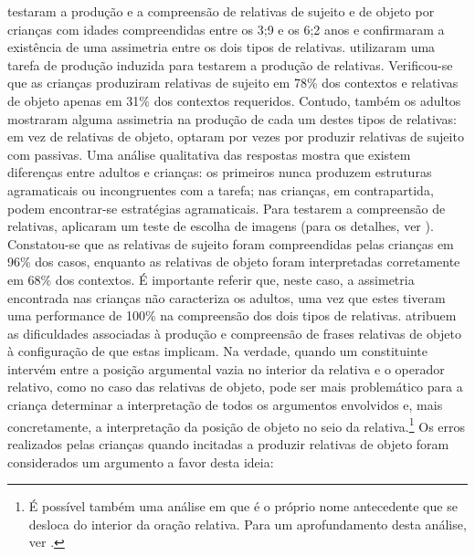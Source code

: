 \documentclass[output=paper]{LSP/langsci}
\begin{document}
\citet{costa_etal2011} testaram a produção e a compreensão de relativas de sujeito e de objeto por crianças com idades compreendidas entre os 3;9 e os 6;2 anos e confirmaram a existência de uma assimetria entre os dois tipos de relativas. \citet{costa_etal2011} utilizaram uma tarefa de produção induzida para testarem a produção de relativas. Verificou-se que as crianças produziram relativas de sujeito em 78\% dos contextos e relativas de objeto apenas em 31\% dos contextos requeridos. Contudo, também os adultos mostraram alguma assimetria na produção de cada um destes tipos de relativas: em vez de relativas de objeto, optaram por vezes por produzir relativas de sujeito com passivas. Uma análise qualitativa das respostas mostra que existem diferenças entre adultos e crianças: os primeiros nunca produzem estruturas agramaticais ou incongruentes com a tarefa; nas crianças, em contrapartida, podem encontrar-se estratégias agramaticais. Para testarem a compreensão de relativas, \citet{costa_etal2011} aplicaram um teste de escolha de imagens (para os detalhes, ver \citealt{costa_etal2011}). Constatou-se que as relativas de sujeito foram compreendidas pelas crianças em 96\% dos casos, enquanto as relativas de objeto foram interpretadas corretamente em 68\% dos contextos. É importante referir que, neste caso, a assimetria encontrada nas crianças não caracteriza os adultos, uma vez que estes tiveram uma performance de 100\% na compreensão dos dois tipos de relativas. \citet{costa_etal2011} atribuem as dificuldades associadas à produção e compreensão de frases relativas de objeto à configuração de  que estas implicam. Na verdade, quando um constituinte intervém entre a posição argumental vazia no interior da relativa e o operador relativo, como no caso das relativas de objeto, pode ser mais problemático para a criança determinar a interpretação de todos os argumentos envolvidos e, mais concretamente, a interpretação da posição de objeto no seio da relativa.\footnote{É possível também uma análise em que é o próprio nome antecedente que se desloca do interior da oração relativa. Para um aprofundamento desta análise, ver \citealt{kayne1994,friedmann_etal2009}.} Os erros realizados pelas crianças quando incitadas a produzir relativas de objeto foram considerados um argumento a favor desta ideia:
\end{document}
